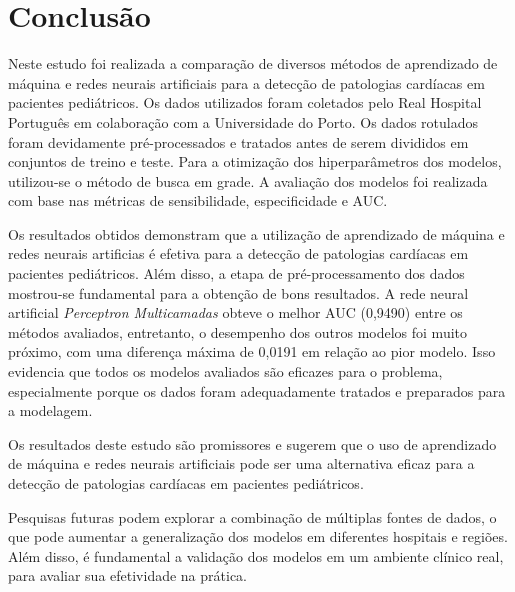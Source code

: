 \section{Conclusão}

Neste estudo foi realizada a comparação de diversos métodos de aprendizado de máquina e redes neurais artificiais para a detecção de patologias cardíacas em pacientes pediátricos. Os dados utilizados foram coletados pelo Real Hospital Português em colaboração com a Universidade do Porto. Os dados rotulados foram devidamente pré-processados e tratados antes de serem divididos em conjuntos de treino e teste. Para a otimização dos hiperparâmetros dos modelos, utilizou-se o método de busca em grade. A avaliação dos modelos foi realizada com base nas métricas de sensibilidade, especificidade e AUC.

Os resultados obtidos demonstram que a utilização de aprendizado de máquina e redes neurais artificias é efetiva para a detecção de patologias cardíacas em pacientes pediátricos. Além disso, a etapa de pré-processamento dos dados mostrou-se fundamental para a obtenção de bons resultados. A rede neural artificial \textit{Perceptron Multicamadas} obteve o melhor AUC (0,9490) entre os métodos avaliados, entretanto, o desempenho dos outros modelos foi muito próximo, com uma diferença máxima de 0,0191 em relação ao pior modelo. Isso evidencia que todos os modelos avaliados são eficazes para o problema, especialmente porque os dados foram adequadamente tratados e preparados para a modelagem.

Os resultados deste estudo são promissores e sugerem que o uso de aprendizado de máquina e redes neurais artificiais pode ser uma alternativa eficaz para a detecção de patologias cardíacas em pacientes pediátricos.

Pesquisas futuras podem explorar a combinação de múltiplas fontes de dados, o que pode aumentar a generalização dos modelos em diferentes hospitais e regiões. Além disso, é fundamental a validação dos modelos em um ambiente clínico real, para avaliar sua efetividade na prática.
